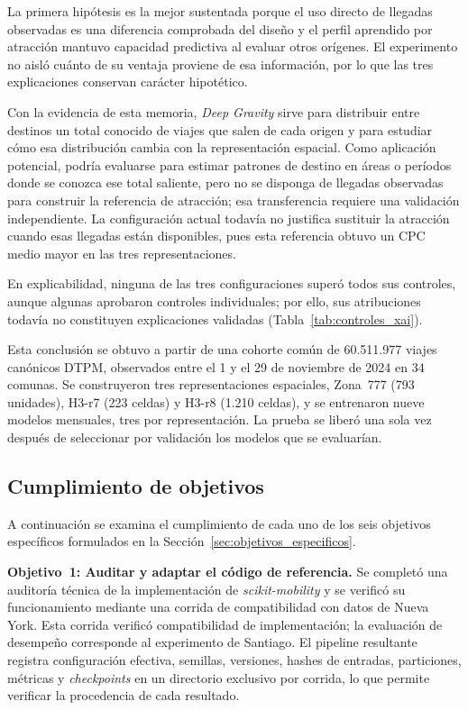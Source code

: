 La primera hipótesis es la mejor sustentada porque el uso directo de llegadas observadas es una diferencia comprobada del diseño y el perfil aprendido por atracción mantuvo capacidad predictiva al evaluar otros orígenes. El experimento no aisló cuánto de su ventaja proviene de esa información, por lo que las tres explicaciones conservan carácter hipotético.

Con la evidencia de esta memoria, \textit{Deep Gravity} sirve para distribuir entre destinos un total conocido de viajes que salen de cada origen y para estudiar cómo esa distribución cambia con la representación espacial. Como aplicación potencial, podría evaluarse para estimar patrones de destino en áreas o períodos donde se conozca ese total saliente, pero no se disponga de llegadas observadas para construir la referencia de atracción; esa transferencia requiere una validación independiente. La configuración actual todavía no justifica sustituir la atracción cuando esas llegadas están disponibles, pues esta referencia obtuvo un CPC medio mayor en las tres representaciones.

En explicabilidad, ninguna de las tres configuraciones superó todos sus controles, aunque algunas aprobaron controles individuales; por ello, sus atribuciones todavía no constituyen explicaciones validadas (Tabla~\ref{tab:controles_xai}).

Esta conclusión se obtuvo a partir de una cohorte común de 60.511.977 viajes canónicos DTPM, observados entre el 1 y el 29 de noviembre de 2024 en 34 comunas. Se construyeron tres representaciones espaciales, Zona~777 (793 unidades), H3-r7 (223 celdas) y H3-r8 (1.210 celdas), y se entrenaron nueve modelos mensuales, tres por representación. La prueba se liberó una sola vez después de seleccionar por validación los modelos que se evaluarían.


\subsection{Cumplimiento de objetivos}

A continuación se examina el cumplimiento de cada uno de los seis objetivos específicos formulados en la Sección~\ref{sec:objetivos_especificos}.

\textbf{Objetivo~1: Auditar y adaptar el código de referencia.} Se completó una auditoría técnica de la implementación de \textit{scikit-mobility} y se verificó su funcionamiento mediante una corrida de compatibilidad con datos de Nueva York. Esta corrida verificó compatibilidad de implementación; la evaluación de desempeño corresponde al experimento de Santiago. El pipeline resultante registra configuración efectiva, semillas, versiones, hashes de entradas, particiones, métricas y \textit{checkpoints} en un directorio exclusivo por corrida, lo que permite verificar la procedencia de cada resultado.

